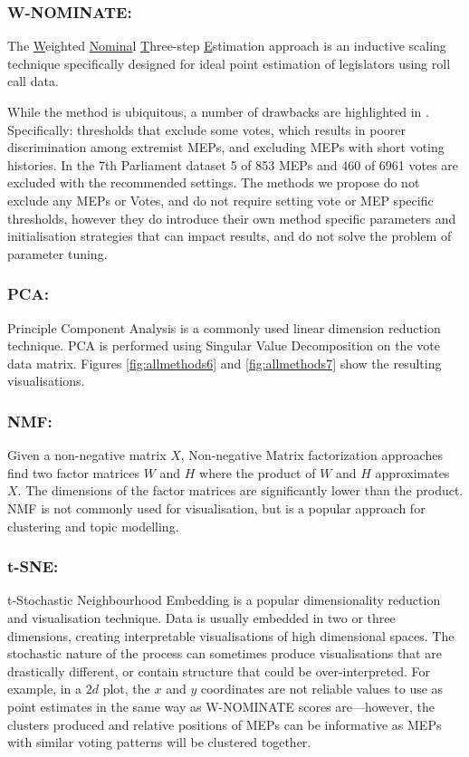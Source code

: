 \documentclass{llncs}
\begin{document}
\subsubsection {W-NOMINATE:} The \underline{W}eighted \underline{Nomina}l \underline{T}hree-step \underline{E}stimation approach \cite{wnominate} is an inductive scaling technique specifically designed for ideal point estimation of legislators using roll call data.

While the method is ubiquitous, a number of drawbacks are highlighted in \cite{clinton2003statistical}. Specifically: thresholds that exclude some votes, which results in poorer discrimination among extremist MEPs, and excluding MEPs with short voting histories. In the 7th Parliament dataset 5 of 853 MEPs and 460 of 6961 votes are excluded with the recommended settings. The methods we propose do not exclude any MEPs or Votes, and do not require setting vote or MEP specific thresholds, however they do introduce their own method specific parameters and initialisation strategies that can impact results, and do not solve the problem of parameter tuning.

\subsubsection{PCA:}
Principle Component Analysis \cite{Fodor02DRSurvey} is a commonly used linear dimension reduction technique. PCA is performed using Singular Value Decomposition on the vote data matrix. Figures \ref{fig:allmethods6} and \ref{fig:allmethods7} show the resulting visualisations.

\subsubsection{NMF:}
Given a non-negative matrix $X$, Non-negative Matrix factorization \cite{nmf1} approaches find two factor matrices $W$ and $H$ where the product of $W$ and $H$ approximates $X$. The dimensions of the factor matrices are significantly lower than the product. NMF is not commonly used for visualisation, but is a popular approach for clustering \cite{nmf} and topic modelling.

\subsubsection{t-SNE:}
t-Stochastic Neighbourhood Embedding is a popular dimensionality reduction and visualisation technique. Data is usually embedded in two or three dimensions, creating interpretable visualisations of high dimensional spaces. The stochastic nature of the process can sometimes produce visualisations that are drastically different, or contain structure that could be over-interpreted. For example, in a $2d$ plot, the $x$ and $y$ coordinates are not reliable values to use as point estimates in the same way as W-NOMINATE scores are---however, the clusters produced and relative positions of MEPs can be informative as MEPs with similar voting patterns will be clustered together. 
\end{document}
